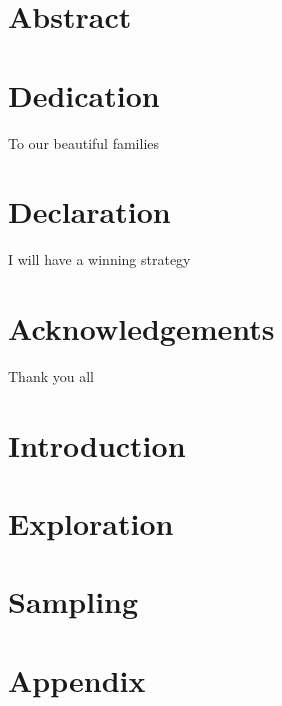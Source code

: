 \documentclass[12pt]{report}
\author{Tilemachos Kosmetsas \& Christos Koutkos}
\date{December 2021}
\begin{document}



\chapter*{Abstract}



\chapter*{Dedication}
To our beautiful families

\chapter*{Declaration}
I will have a winning strategy 

\chapter*{Acknowledgements}
Thank you all

\tableofcontents

\listoffigures

\listoftables


\chapter{Introduction}


\chapter{Exploration}


\chapter{Sampling}


\appendix
\chapter*{Appendix}


\printbibliography
\end{document}
